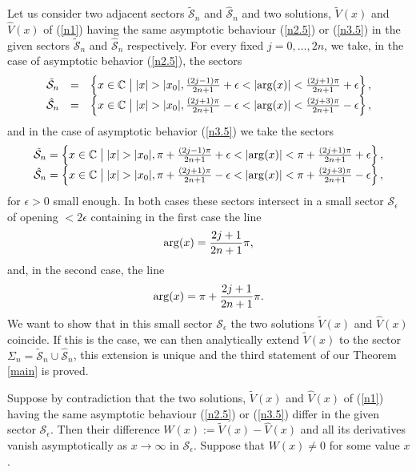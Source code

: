 \documentclass{amsart}
\theoremstyle{definition}
\theoremstyle{remark}
\theoremstyle{remark}
\begin{document}
Let us consider two adjacent sectors $\tilde{\mathcal S}_n$ and
$\hat{\mathcal S}_n$ and two solutions, ${\tilde V}(x)$ and
${\hat V}(x)$ of (\ref{n1}) having the same asymptotic behaviour
(\ref{n2.5}) or (\ref{n3.5}) in the given sectors $\tilde{\mathcal S}_n$
and $\hat{\mathcal S}_n$ respectively.
For every fixed $j=0,\dots,2n$, we take, in the case of asymptotic
behavior (\ref{n2.5}), the sectors
$$
\begin{array}{ccc}
     \tilde{\mathcal S}_n&=&\left\{x\in\Complex\bigm| |x|>|x_{0}|,
   {(2j-1)\pi\over 2n+1}+\epsilon
<|\arg(x)|<{(2j+1)\pi\over 2n+1}+\epsilon\right\},\\
  \hat{\mathcal S}_n&=&\left\{x\in\Complex\bigm| |x|>|x_{0}|,
  {(2 j+1) \pi\over 2n+1}-\epsilon<
|\arg(x)|<{(2j+3)\pi\over 2n+1}-\epsilon \right\},\\
  \end{array}
$$
and in the case of asymptotic behavior (\ref{n3.5}) we take the sectors
$$
\begin{array}{c}
     \tilde{\mathcal S}_n=\left\{x\in\Complex\bigm| |x|>|x_{0}|,
   \pi+{(2j-1)\pi\over 2n+1}+\epsilon
<|\arg(x)|<\pi+{(2j+1)\pi\over 2n+1}+\epsilon\right\},\\
  \hat{\mathcal S}_n=\left\{x\in\Complex\bigm| |x|>|x_{0}|,
  \pi+{(2j+1)\pi\over 2n+1}-\epsilon<
|\arg(x)|<\pi+{(2j+3)\pi\over 2n+1}-\epsilon \right\},\\
  \end{array}
$$
for $\epsilon>0$ small enough. In both cases
these sectors intersect in a small sector ${\mathcal S}_\epsilon$
of opening $<2\epsilon$ containing in the first case the line
$$
{\rm arg}(x) =  {2j+1\over 2n+1}\pi,
$$
and, in the second case, the line
$$
{\rm arg}(x) = \pi + {2j+1\over 2n+1}\pi.
$$
We want to show that in this small sector ${\mathcal S}_\epsilon$ the
two solutions ${\tilde V}(x)$ and ${\hat V}(x)$ coincide. If this is the case,
we can then analytically extend ${\tilde V}(x)$ to the sector
$\Sigma_n=\tilde{\mathcal S}_n\cup \hat{\mathcal S}_n$, this extension is
unique and the third statement of our Theorem \ref{main} is proved.

Suppose by contradiction that the  two solutions, ${\tilde V}(x)$
and ${\hat V}(x)$ of (\ref{n1}) having the same asymptotic behaviour
(\ref{n2.5}) or (\ref{n3.5}) differ in the given sector
${\mathcal S}_\epsilon$. Then
their difference $W(x):={\tilde V}(x)-{\hat V}(x)$ and all its derivatives
vanish asymptotically as $x\to\infty$ in ${\mathcal S}_\epsilon$. Suppose
that $W(x)\neq 0$ for some value $x$.
\end{document}

